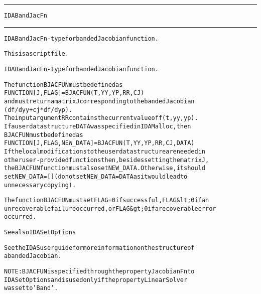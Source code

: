 \begin{samepage}
\hrule
\begin{center}
{\large \verb!IDABandJacFn!}
\label{p:IDABandJacFn}
\end{center}
\hrule\vspace{0.1in}



\begin{alltt}
IDABandJacFn - type for banded Jacobian function.
\end{alltt}

\end{samepage}



\begin{samepage}


\begin{alltt}
This is a script file. 
\end{alltt}

\end{samepage}



\begin{alltt}
IDABandJacFn - type for banded Jacobian function.

   The function BJACFUN must be defined as 
        FUNCTION [J, FLAG] = BJACFUN(T, YY, YP, RR, CJ)
   and must return a matrix J corresponding to the banded Jacobian
   (df/dyy + cj*df/dyp).
   The input argument RR contains the current value of f(t,yy,yp).
   If a user data structure DATA was specified in IDAMalloc, then
   BJACFUN must be defined as
        FUNCTION [J, FLAG, NEW_DATA] = BJACFUN(T, YY, YP, RR, CJ, DATA)
   If the local modifications to the user data structure are needed in
   other user-provided functions then, besides setting the matrix J,
   the BJACFUN function must also set NEW_DATA. Otherwise, it should 
   set NEW_DATA=[] (do not set NEW_DATA = DATA as it would lead to 
   unnecessary copying).

   The function BJACFUN must set FLAG=0 if successful, FLAG&lt;0 if an
   unrecoverable failure occurred, or FLAG&gt;0 if a recoverable error
   occurred.

   See also IDASetOptions

   See the IDAS user guide for more information on the structure of
   a banded Jacobian.

   NOTE: BJACFUN is specified through the property JacobianFn to
   IDASetOptions and is used only if the property LinearSolver
   was set to 'Band'.
\end{alltt}






\vspace{0.1in}
